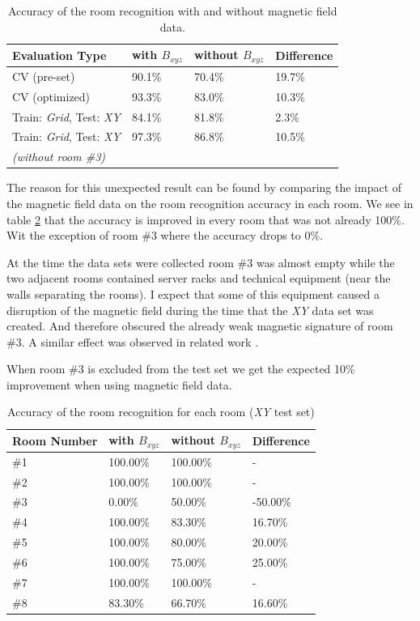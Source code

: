 \begin{table}
\centering
\begin{tabular}{l l l l}
\toprule
\textbf{Evaluation Type}&\textbf{with }\boldmath$B_{xyz}$&\textbf{without }\boldmath$B_{xyz}$&\textbf{Difference} \\
\midrule
CV (pre-set)&90.1\%&70.4\%&19.7\%\\
CV (optimized)&93.3\%&83.0\%&10.3\%\\
Train: \emph{Grid}, Test: \emph{XY}&84.1\%&81.8\%&2.3\%\\
Train: \emph{Grid}, Test: \emph{XY}&97.3\%&86.8\%&10.5\%\\
\textit{(without room \#3)}&&\\
\bottomrule
\end{tabular}
\caption[Room Recognition - Magnetic Field improvements]{Accuracy of the room recognition with and without magnetic field data.}
\label{tab:RoomRecognitionMagneticField}
\end{table}

The reason for this unexpected result can be found by comparing the impact of the magnetic field data on the  room recognition accuracy in each room. We see in table \ref{tab:RoomRecognitionPerRoom} that the accuracy is improved in every room that was not already 100\%. Wit the exception of room \#3 where the accuracy drops to 0\%. 

At the time the data sets were collected room \#3 was almost empty while the two adjacent rooms contained server racks and technical equipment (near the walls separating the rooms). I expect that some of this equipment caused a disruption of the magnetic field during the time that the \emph{XY} data set was created. And therefore obscured the already weak magnetic signature of room \#3. A similar effect was observed in related work \citep{Li2012feasableMagnetic}.

When room \#3 is excluded from the test set we get the expected 10\% improvement when using magnetic field data.

\begin{table}
\centering
\begin{tabular}{l l l l}
\toprule
\textbf{Room Number}&\textbf{with }\boldmath$B_{xyz}$&\textbf{without }\boldmath$B_{xyz}$&\textbf{Difference} \\
\midrule
\#1&100.00\%&100.00\%&-\\
\#2&100.00\%&100.00\%&-\\
\#3&0.00\%&50.00\%&-50.00\%\\
\#4&100.00\%&83.30\%&16.70\%\\
\#5&100.00\%&80.00\%&20.00\%\\
\#6&100.00\%&75.00\%&25.00\%\\
\#7&100.00\%&100.00\%&-\\
\#8&83.30\%&66.70\%&16.60\%\\
\bottomrule
\end{tabular}
\caption[Room Recognition - Accuracy per room]{Accuracy of the room recognition for each room (\emph{XY} test set)}
\label{tab:RoomRecognitionPerRoom}
\end{table}



